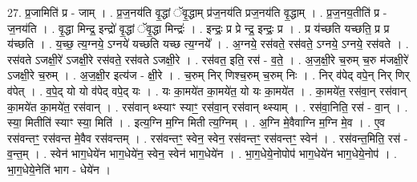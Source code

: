 \documentclass[17pt]{extarticle}
\begin{document}
27. प्र॒जामिति॑ प्र - जाम् । . प्र॒ज॒नय॑ति वृ॒द्धां ॅवृ॒द्धाम् प्र॑ज॒नय॑ति प्रज॒नय॑ति वृ॒द्धाम् । . प्र॒ज॒नय॒तीति॑ प्र - ज॒नय॑ति । . वृ॒द्धा मिन्द्र॒ इन्द्रो॑ वृ॒द्धां ॅवृ॒द्धा मिन्द्रः॑ । . इन्द्रः॒ प्र प्रे न्द्र॒ इन्द्रः॒ प्र । . प्र य॑च्छति यच्छति॒ प्र प्र य॑च्छति । . य॒च्छ॒ त्य॒ग्नये॒ ऽग्नये॑ यच्छति यच्छ त्य॒ग्नये᳚ । . अ॒ग्नये॒ रस॑वते॒ रस॑वते॒ ऽग्नये॒ ऽग्नये॒ रस॑वते । . रस॑वते ऽजक्षी॒रे॑ ऽजक्षी॒रे रस॑वते॒ रस॑वते ऽजक्षी॒रे । . रस॑वत॒ इति॒ रस॑ - व॒ते॒ । . अ॒ज॒क्षी॒रे च॒रुम् च॒रु म॑जक्षी॒रे॑ ऽजक्षी॒रे च॒रुम् । . अ॒ज॒क्षी॒र इत्य॑ज - क्षी॒रे । . च॒रुम् निर् णिश्च॒रुम् च॒रुम् निः । . निर् व॑पेद् वपे॒न् निर् णिर् व॑पेत् । . व॒पे॒द् यो यो व॑पेद् वपे॒द् यः । . यः का॒मये॑त का॒मये॑त॒ यो यः का॒मये॑त । . का॒मये॑त॒ रस॑वा॒न् रस॑वान् का॒मये॑त का॒मये॑त॒ रस॑वान् । . रस॑वान् थ्स्याꣳ स्याꣳ॒॒ रस॑वा॒न् रस॑वान् थ्स्याम् । . रस॑वा॒निति॒ रस॑ - वा॒न् । . स्या॒ मितीति॑ स्याꣳ स्या॒ मिति॑ । . इत्य॒ग्नि म॒ग्नि मिती त्य॒ग्निम् । . अ॒ग्नि मे॒वैवाग्नि म॒ग्नि मे॒व । . ए॒व रस॑वन्तꣳ॒॒ रस॑वन्त मे॒वैव रस॑वन्तम् । . रस॑वन्तꣳ॒॒ स्वेन॒ स्वेन॒ रस॑वन्तꣳ॒॒ रस॑वन्तꣳ॒॒ स्वेन॑ । . रस॑वन्त॒मिति॒ रस॑ - व॒न्त॒म् । . स्वेन॑ भाग॒धेये॑न भाग॒धेये॑न॒ स्वेन॒ स्वेन॑ भाग॒धेये॑न । . भा॒ग॒धेये॒नोपोप॑ भाग॒धेये॑न भाग॒धेये॒नोप॑ । . भा॒ग॒धेये॒नेति॑ भाग - धेये॑न । \newline
\end{document}
